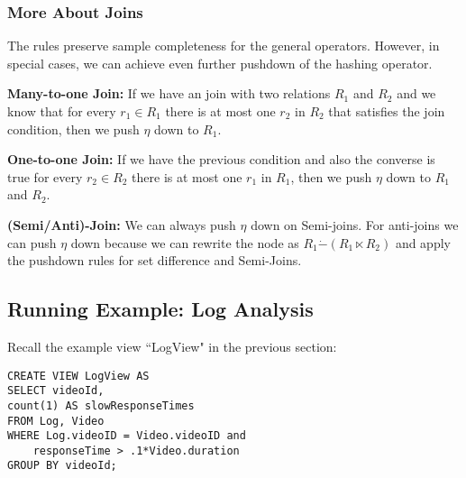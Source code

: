 \subsubsection{More About Joins} 
The rules preserve sample completeness for the general operators. 
However, in special cases, we can achieve even further pushdown of the hashing operator. 

\textbf{Many-to-one Join: } If we have an join with two relations $R_1$ and $R_2$ and we know that for every $r_1 \in R_1$ there is at most one $r_2$ in $R_2$ that satisfies the join condition, then we push $\eta$ down to $R_1$.

\textbf{One-to-one Join: } If we have the previous condition and also the converse is true for every $r_2 \in R_2$ there is at most one $r_1$ in $R_1$, then we push $\eta$ down to $R_1$ and $R_2$.

\textbf{(Semi/Anti)-Join: } We can always push $\eta$ down on Semi-joins. For anti-joins we can push $\eta$ down because we can rewrite the node as $R_1 \dot{-} (R_1 \ltimes R_2) $ and apply the pushdown rules for set difference and Semi-Joins.

\subsection{Running Example: Log Analysis}
Recall the example view ``LogView" in the previous section:
\begin{lstlisting} 
CREATE VIEW LogView AS 
SELECT videoId, 
count(1) AS slowResponseTimes 
FROM Log, Video
WHERE Log.videoID = Video.videoID and
    responseTime > .1*Video.duration
GROUP BY videoId;
\end{lstlisting}

